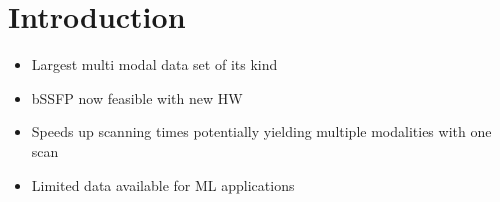 \chapter{Introduction}
\begin{itemize}
 \item Largest multi modal data set of its kind
 \item bSSFP now feasible with new HW
 \item Speeds up scanning times potentially yielding multiple modalities with one scan
 \item Limited data available for ML applications
\end{itemize}
